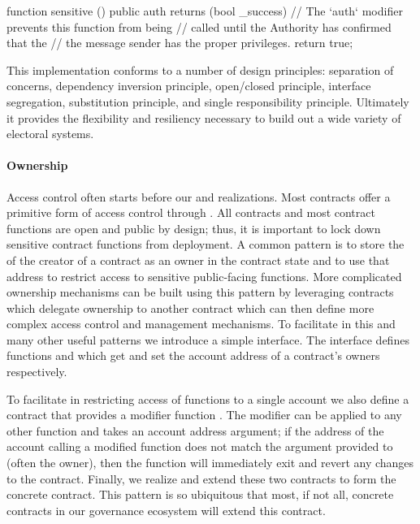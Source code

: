 \begin{solidity}
function sensitive () public auth returns (bool _success) {
  // The `auth` modifier prevents this function from being
  // called until the Authority has confirmed that the
  // the message sender has the proper privileges.
  return true;
}
\end{solidity}

This implementation conforms to a number of design principles: separation of
concerns, dependency inversion principle, open/closed principle, interface
segregation, substitution principle, and single responsibility principle.
Ultimately it provides the flexibility and resiliency necessary to build out a
wide variety of electoral systems.

\paragraph{Ownership}
Access control often starts before our  and 
realizations. Most contracts offer a primitive form of access control through
. All contracts and most contract functions are open and public
by design; thus, it is important to lock down sensitive contract functions from
deployment. A common pattern is to store the  of the creator of a
contract as an owner in the contract state and to use that address to restrict
access to sensitive public-facing functions. More complicated ownership
mechanisms can be built using this pattern by leveraging contracts which
delegate ownership to another contract which can then define more complex access
control and management mechanisms. To facilitate in this and many other useful
patterns we introduce a simple  interface. The 
interface defines functions  and  which get and set
the account address of a contract's owners respectively.

To facilitate in restricting access of functions to a single account we also
define a contract  that provides a modifier function
. The  modifier can be applied to any other
function and takes an account address argument; if the address of the account
calling a  modified function does not match the argument
provided to  (often the owner), then the function will
immediately exit and revert any changes to the contract. Finally, we realize and
extend these two contracts to form the concrete  contract. This
pattern is so ubiquitous that most, if not all, concrete contracts in our
governance ecosystem will extend this contract.

